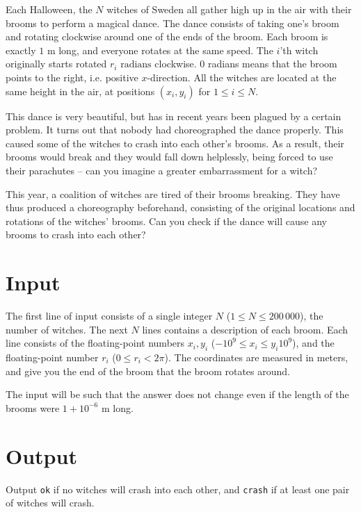 Each Halloween, the $N$ witches of Sweden all gather high up in the air with their brooms to perform a magical dance.
The dance consists of taking one's broom and rotating clockwise around one of the ends of the broom.
Each broom is exactly $1\text{ m}$ long, and everyone rotates at the same speed.
The $i$'th witch originally starts rotated $r_i\text{ radians}$ clockwise.
0 radians means that the broom points to the right, i.e. positive $x$-direction.
All the witches are located at the same height in the air, at positions $(x_i, y_i)$ for $1 \le i \le N$.

This dance is very beautiful, but has in recent years been plagued by a certain problem.
It turns out that nobody had choreographed the dance properly.
This caused some of the witches to crash into each other's brooms.
As a result, their brooms would break and they would fall down helplessly, being forced to use their parachutes -- can you imagine a greater embarrassment for a witch?

This year, a coalition of witches are tired of their brooms breaking.
They have thus produced a choreography beforehand, consisting of the original locations and rotations of the witches' brooms.
Can you check if the dance will cause any brooms to crash into each other?

\section*{Input}
The first line of input consists of a single integer $N$ ($1 \le N \le 200\,000$), the number of witches.
The next $N$ lines contains a description of each broom.
Each line consists of the floating-point numbers $x_i, y_i$ ($-10^{9} \le x_i \le y_i 10^{9}$), and the floating-point number $r_i$ ($0 \le r_i < 2\pi$).
The coordinates are measured in meters, and give you the end of the broom that the broom rotates around.

The input will be such that the answer does not change even if the length of the brooms were $1 + 10^{-6}\text{ m}$ long.

\section*{Output}
Output \texttt{ok} if no witches will crash into each other, and \texttt{crash} if at least one pair of witches will crash.
